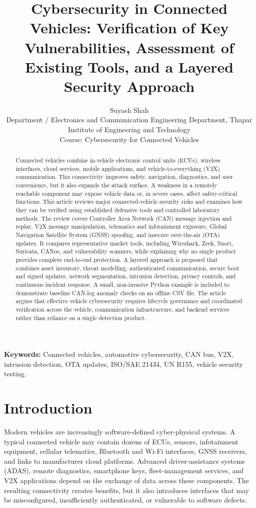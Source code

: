 \documentclass[11pt]{article}
\title{Cybersecurity in Connected Vehicles: Verification of Key Vulnerabilities, Assessment of Existing Tools, and a Layered Security Approach}
\author{Suyash Shah\\
Department / Electronics and Communication Engineering Department, Thapar Institute of Engineering and Technology\\
Course: Cybersecurity for Connected Vehicles}
\date{}
\begin{document}
\maketitle

\begin{abstract}
Connected vehicles combine in-vehicle electronic control units (ECUs), wireless interfaces, cloud services, mobile applications, and vehicle-to-everything (V2X) communication. This connectivity improves safety, navigation, diagnostics, and user convenience, but it also expands the attack surface. A weakness in a remotely reachable component may expose vehicle data or, in severe cases, affect safety-critical functions. This article reviews major connected-vehicle security risks and examines how they can be verified using established defensive tools and controlled laboratory methods. The review covers Controller Area Network (CAN) message injection and replay, V2X message manipulation, telematics and infotainment exposure, Global Navigation Satellite System (GNSS) spoofing, and insecure over-the-air (OTA) updates. It compares representative market tools, including Wireshark, Zeek, Snort, Suricata, CANoe, and vulnerability scanners, while explaining why no single product provides complete end-to-end protection. A layered approach is proposed that combines asset inventory, threat modelling, authenticated communication, secure boot and signed updates, network segmentation, intrusion detection, privacy controls, and continuous incident response. A small, non-invasive Python example is included to demonstrate baseline CAN-log anomaly checks on an offline CSV file. The article argues that effective vehicle cybersecurity requires lifecycle governance and coordinated verification across the vehicle, communication infrastructure, and backend services rather than reliance on a single detection product.
\end{abstract}

\noindent\textbf{Keywords:} Connected vehicles, automotive cybersecurity, CAN bus, V2X, intrusion detection, OTA updates, ISO/SAE 21434, UN R155, vehicle security testing.

\section{Introduction}
Modern vehicles are increasingly software-defined cyber-physical systems. A typical connected vehicle may contain dozens of ECUs, sensors, infotainment equipment, cellular telematics, Bluetooth and Wi-Fi interfaces, GNSS receivers, and links to manufacturer cloud platforms. Advanced driver-assistance systems (ADAS), remote diagnostics, smartphone keys, fleet-management services, and V2X applications depend on the exchange of data across these components. The resulting connectivity creates benefits, but it also introduces interfaces that may be misconfigured, insufficiently authenticated, or vulnerable to software defects.
\end{document}
